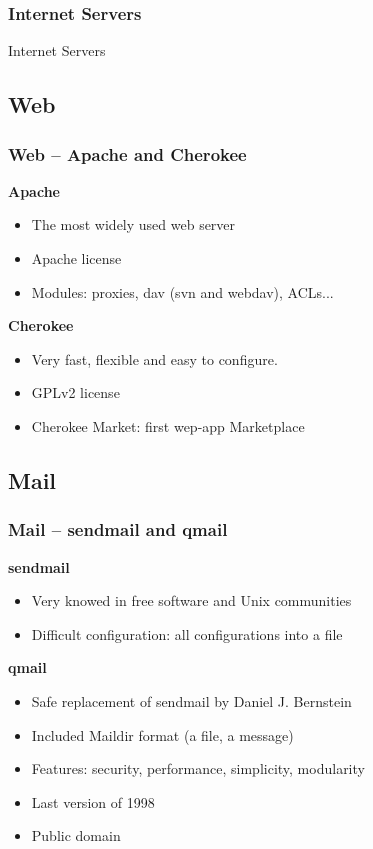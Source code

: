 \documentclass{beamer}
\begin{document}
\begin{frame}
  \frametitle{Internet Servers}
  \begin{center}
    \Huge Internet Servers
  \end{center}
\end{frame}

  \subsection{Web}
  \begin{frame}
    \frametitle{Web -- Apache and Cherokee}
    \textbf{Apache}
    \begin{itemize}
      \item The most widely used web server
      \item Apache license
      \item Modules: proxies, dav (svn and webdav), ACLs...
    \end{itemize}
    \textbf{Cherokee}
    \begin{itemize}
      \item Very fast, flexible and easy to configure.
      \item GPLv2 license
      \item Cherokee Market: first wep-app Marketplace
    \end{itemize}
  \end{frame}

  \subsection{Mail}
  
  \begin{frame}
    \frametitle{Mail -- sendmail and qmail}
    \textbf{sendmail}
    \begin{itemize}
      \item Very knowed in free software and Unix communities
      \item Difficult configuration: all configurations into a file
    \end{itemize}
    \textbf{qmail}
    \begin{itemize}
      \item Safe replacement of sendmail by Daniel J. Bernstein
      \item Included Maildir format (a file, a message)
      \item Features: security, performance, simplicity, modularity
      \item Last version of 1998
      \item Public domain
    \end{itemize}
  \end{frame}
  
\end{document}
